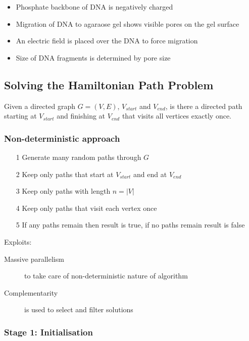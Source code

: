 \documentclass[a4paper]{article}
\begin{document}
\begin{itemize}
  \item Phosphate backbone of DNA is negatively charged
  \item Migration of DNA to agaraose gel shows visible pores on the gel surface
  \item An electric field is placed over the DNA to force migration
  \item Size of DNA fragments is determined by pore size
\end{itemize}

\subsection{Solving the Hamiltonian Path Problem}

Given a directed graph $G=(V,E)$, $V_{start}$ and $V_{end}$, is there a directed
path starting at $V_{start}$ and finishing at $V_{end}$ that visits all vertices
exactly once.

\subsubsection{Non-deterministic approach}

\begin{enumerate}
  \item[1] Generate many random paths through $G$
  \item[2] Keep only paths that start at $V_{start}$ and end at $V_{end}$
  \item[3] Keep only paths with length $n = |V|$
  \item[4] Keep only paths that visit each vertex once
  \item[5] If any paths remain then result is true, if no paths remain result is
           false
\end{enumerate}

Exploits:

\begin{description}
  \item[Massive parallelism] to take care of non-deterministic nature of
                             algorithm
  \item[Complementarity] is used to select and filter solutions
\end{description}

\subsubsection{Stage 1: Initialisation}
\end{document}
